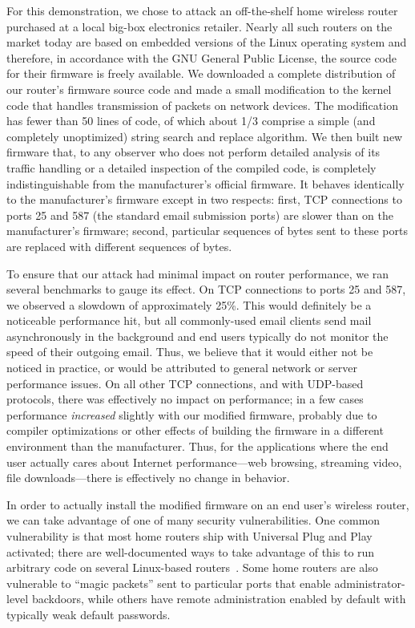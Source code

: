 \documentclass{article}
\begin{document}
For this demonstration, we chose to attack an off-the-shelf home
wireless router purchased at a local big-box electronics
retailer. Nearly all such routers on the market today are based on
embedded versions of the Linux operating system and therefore, in
accordance with the GNU General Public License, the source code for
their firmware is freely available. We downloaded a complete
distribution of our router's firmware source code and made a small
modification to the kernel code that handles transmission of packets
on network devices. The modification has fewer than 50 lines of code,
of which about 1/3 comprise a simple (and completely unoptimized)
string search and replace algorithm. We then built new firmware that,
to any observer who does not perform detailed analysis of its traffic
handling or a detailed inspection of the compiled code, is completely
indistinguishable from the manufacturer's official firmware. It
behaves identically to the manufacturer's firmware except in two
respects: first, TCP connections to ports 25 and 587 (the standard
email submission ports) are slower than on the manufacturer's
firmware; second, particular sequences of bytes sent to these ports
are replaced with different sequences of bytes.

To ensure that our attack had minimal impact on router performance, we
ran several benchmarks to gauge its effect. On TCP connections to
ports 25 and 587, we observed a slowdown of approximately 25\%. This
would definitely be a noticeable performance hit, but all
commonly-used email clients send mail asynchronously in the background
and end users typically do not monitor the speed of their outgoing
email. Thus, we believe that it would either not be noticed in
practice, or would be attributed to general network or server
performance issues. On all other TCP connections, and with UDP-based
protocols, there was effectively no impact on performance; in a few
cases performance \emph{increased} slightly with our modified
firmware, probably due to compiler optimizations or other effects of
building the firmware in a different environment than the
manufacturer. Thus, for the applications where the end user actually
cares about Internet performance---web browsing, streaming video, file
downloads---there is effectively no change in behavior.

In order to actually install the modified firmware on an end user's
wireless router, we can take advantage of one of many security
vulnerabilities. One common vulnerability is that most home routers
ship with Universal Plug and Play activated; there are well-documented
ways to take advantage of this to run arbitrary code on several
Linux-based routers~\cite{UPnP}. Some home routers are also vulnerable
to ``magic packets'' sent to particular ports that enable
administrator-level backdoors, while others have remote administration
enabled by default with typically weak default passwords.
\end{document}
